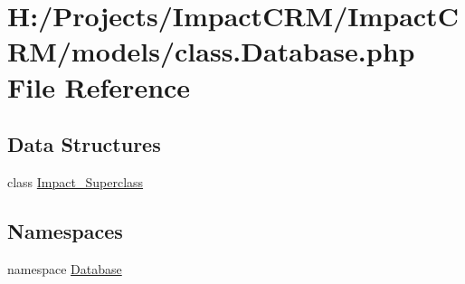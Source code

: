 \hypertarget{class_8Database_8php}{
\section{H:/Projects/ImpactCRM/ImpactCRM/models/class.Database.php File Reference}
\label{class_8Database_8php}
}
\subsection*{Data Structures}
\begin{DoxyCompactItemize}
\item 
class \hyperlink{classImpact__Superclass}{Impact\_\-Superclass}
\end{DoxyCompactItemize}
\subsection*{Namespaces}
\begin{DoxyCompactItemize}
\item 
namespace \hyperlink{namespaceDatabase}{Database}
\end{DoxyCompactItemize}
